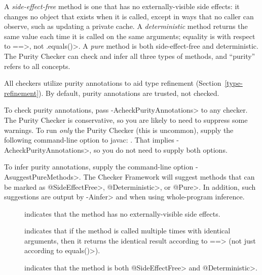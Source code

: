 
A \emph{side-effect-free} method is one that has no externally-visible side
effects:  it changes no object that exists when it is called, except in ways
that no caller can observe, such as updating a private cache.
A \emph{deterministic} method returns the same value each time it is called
on the same arguments; equality is with respect to \<==>, not \<.equals()>.
A \emph{pure} method is both side-effect-free and deterministic.
The Purity Checker can check and infer all three types of methods,
and ``purity'' refers to all concepts.

All checkers utilize purity annotations to aid type refinement
(Section~\ref{type-refinement}).  By default, purity annotations are
trusted, not checked.

To check purity annotations, pass \<-AcheckPurityAnnotations> to any
checker.
The Purity Checker is conservative, so you are likely to need to suppress
some warnings.
To run \emph{only} the Purity Checker (this is uncommon),
supply the following command-line option to javac:
.
That implies \<-AcheckPurityAnnotations>, so you do not need to supply
both options.

To infer purity annotations,
supply the command-line option \<-AsuggestPureMethods>.
The Checker Framework will suggest methods that can be marked as
\<@SideEffectFree>, \<@Deterministic>, or \<@Pure>.
In addition, such suggestions are output by \<-Ainfer> and when using
whole-program inference.



\begin{description}

\item[]
  indicates that the method has no externally-visible side effects.

\item[]
  indicates that if the method is called multiple times with identical
  arguments, then it returns the identical result according to \<==>
  (not just according to \<equals()>).

\item[]
  indicates that the method is both \<@SideEffectFree> and \<@Deterministic>.

\end{description}



